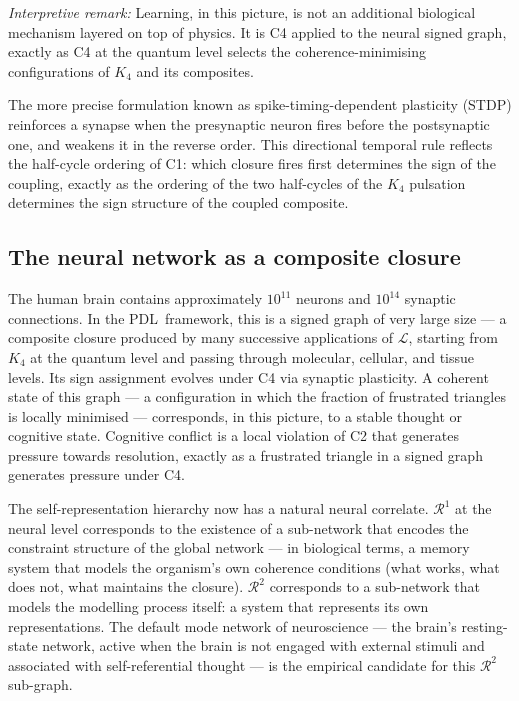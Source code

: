 \documentclass[12pt,a4paper]{article}
\theoremstyle{plain}
\theoremstyle{definition}
\theoremstyle{remark}
\newcommand{\PDL}{\textsc{PDL}}
\newcommand{\Kfour}{K_4}
\newcommand{\Rop}{\mathcal{R}}
\newcommand{\Lop}{\mathcal{L}}
\begin{document}
\emph{Interpretive remark:} Learning, in this picture, is not an additional
biological mechanism layered on top of physics. It is C4 applied to the neural
signed graph, exactly as C4 at the quantum level selects the coherence-minimising
configurations of $\Kfour$ and its composites.

The more precise formulation known as spike-timing-dependent plasticity (STDP)
reinforces a synapse when the presynaptic neuron fires before the postsynaptic one,
and weakens it in the reverse order. This directional temporal rule reflects the
half-cycle ordering of C1: which closure fires first determines the sign of the
coupling, exactly as the ordering of the two half-cycles of the $\Kfour$ pulsation
determines the sign structure of the coupled composite.

\subsection{The neural network as a composite closure}

The human brain contains approximately $10^{11}$ neurons and $10^{14}$ synaptic
connections. In the \PDL\ framework, this is a signed graph of very large size ---
a composite closure produced by many successive applications of $\Lop$, starting from
$\Kfour$ at the quantum level and passing through molecular, cellular, and tissue
levels. Its sign assignment evolves under C4 via synaptic plasticity. A coherent
state of this graph --- a configuration in which the fraction of frustrated triangles
is locally minimised --- corresponds, in this picture, to a stable thought or
cognitive state. Cognitive conflict is a local violation of C2 that generates
pressure towards resolution, exactly as a frustrated triangle in a signed graph
generates pressure under C4.

The self-representation hierarchy now has a natural neural correlate. $\Rop^1$ at
the neural level corresponds to the existence of a sub-network that encodes the
constraint structure of the global network --- in biological terms, a memory system
that models the organism's own coherence conditions (what works, what does not, what
maintains the closure). $\Rop^2$ corresponds to a sub-network that models the
modelling process itself: a system that represents its own representations. The
default mode network of neuroscience --- the brain's resting-state network, active
when the brain is not engaged with external stimuli and associated with
self-referential thought --- is the empirical candidate for this $\Rop^2$ sub-graph.
\end{document}
